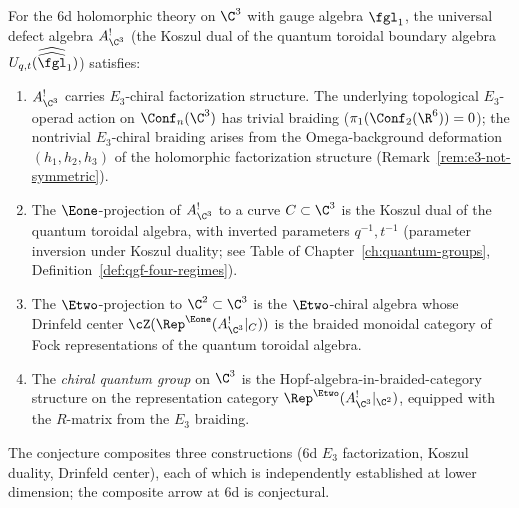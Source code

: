 \begin{conjecture}
\label{conj:6d-defect-c3}
\ClaimStatusConjectured
For the 6d holomorphic theory on $\C^3$ with gauge algebra $\fgl_1$, the universal defect algebra $A^!_{\C^3}$ (the Koszul dual of the quantum toroidal boundary algebra $U_{q,t}(\widehat{\widehat{\fgl}}_1)$) satisfies:
\begin{enumerate}[label=\textup{(\roman*)}]
 \item $A^!_{\C^3}$ carries $E_3$-chiral factorization structure. The underlying topological $E_3$-operad action on $\Conf_n(\C^3)$ has trivial braiding ($\pi_1(\Conf_2(\R^6)) = 0$); the nontrivial $E_3$-chiral braiding arises from the Omega-background deformation $(h_1, h_2, h_3)$ of the holomorphic factorization structure (Remark~\ref{rem:e3-not-symmetric}).
 \item The $\Eone$-projection of $A^!_{\C^3}$ to a curve $C \subset \C^3$ is the Koszul dual of the quantum toroidal algebra, with inverted parameters $q^{-1}, t^{-1}$ (parameter inversion under Koszul duality; see Table of Chapter~\ref{ch:quantum-groups}, Definition~\ref{def:qgf-four-regimes}).
 \item The $\Etwo$-projection to $\C^2 \subset \C^3$ is the $\Etwo$-chiral algebra whose Drinfeld center $\cZ(\Rep^{\Eone}(A^!_{\C^3}|_C))$ is the braided monoidal category of Fock representations of the quantum toroidal algebra.
 \item The \emph{chiral quantum group} on $\C^3$ is the Hopf-algebra-in-braided-category structure on the representation category $\Rep^{\Etwo}(A^!_{\C^3}|_{\C^2})$, equipped with the $R$-matrix from the $E_3$ braiding.
\end{enumerate}
The conjecture composites three constructions (6d $E_3$ factorization, Koszul duality, Drinfeld center), each of which is independently established at lower dimension; the composite arrow at 6d is conjectural.
\end{conjecture}

